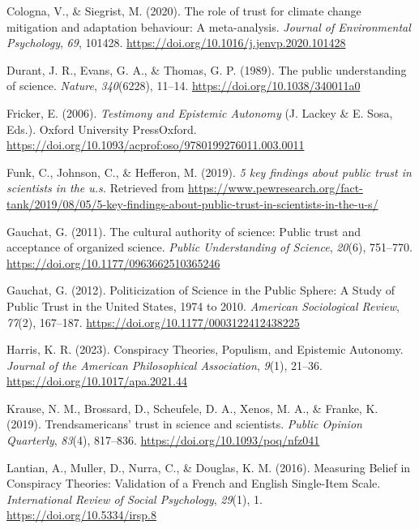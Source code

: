 \documentclass[
  doc,floatsintext]{apa6}
\newlength{\cslhangindent}
\newenvironment{CSLReferences}[2] %
 {\begin{list}{}{%
  \setlength{\itemindent}{0pt}
  \setlength{\leftmargin}{0pt}
  \setlength{\parsep}{0pt}
  \ifodd #1
   \setlength{\leftmargin}{\cslhangindent}
   \setlength{\itemindent}{-1\cslhangindent}
  \fi
  \setlength{\itemsep}{#2\baselineskip}}}
 {\end{list}}
\begin{document}
\begin{CSLReferences}{1}{0}
Cologna, V., \& Siegrist, M. (2020). The role of trust for climate change mitigation and adaptation behaviour: A meta-analysis. \emph{Journal of Environmental Psychology}, \emph{69}, 101428. \url{https://doi.org/10.1016/j.jenvp.2020.101428}

Durant, J. R., Evans, G. A., \& Thomas, G. P. (1989). The public understanding of science. \emph{Nature}, \emph{340}(6228), 11--14. \url{https://doi.org/10.1038/340011a0}

Fricker, E. (2006). \emph{Testimony and Epistemic Autonomy} (J. Lackey \& E. Sosa, Eds.). Oxford University PressOxford. \url{https://doi.org/10.1093/acprof:oso/9780199276011.003.0011}

Funk, C., Johnson, C., \& Hefferon, M. (2019). \emph{5 key findings about public trust in scientists in the u.s.} Retrieved from \url{https://www.pewresearch.org/fact-tank/2019/08/05/5-key-findings-about-public-trust-in-scientists-in-the-u-s/}

Gauchat, G. (2011). The cultural authority of science: Public trust and acceptance of organized science. \emph{Public Understanding of Science}, \emph{20}(6), 751--770. \url{https://doi.org/10.1177/0963662510365246}

Gauchat, G. (2012). Politicization of Science in the Public Sphere: A Study of Public Trust in the United States, 1974 to 2010. \emph{American Sociological Review}, \emph{77}(2), 167--187. \url{https://doi.org/10.1177/0003122412438225}

Harris, K. R. (2023). Conspiracy Theories, Populism, and Epistemic Autonomy. \emph{Journal of the American Philosophical Association}, \emph{9}(1), 21--36. \url{https://doi.org/10.1017/apa.2021.44}

Krause, N. M., Brossard, D., Scheufele, D. A., Xenos, M. A., \& Franke, K. (2019). Trends{\textemdash}americans{'} trust in science and scientists. \emph{Public Opinion Quarterly}, \emph{83}(4), 817--836. \url{https://doi.org/10.1093/poq/nfz041}

Lantian, A., Muller, D., Nurra, C., \& Douglas, K. M. (2016). Measuring Belief in Conspiracy Theories: Validation of a French and English Single-Item Scale. \emph{International Review of Social Psychology}, \emph{29}(1), 1. \url{https://doi.org/10.5334/irsp.8}


\end{CSLReferences}
\end{document}
